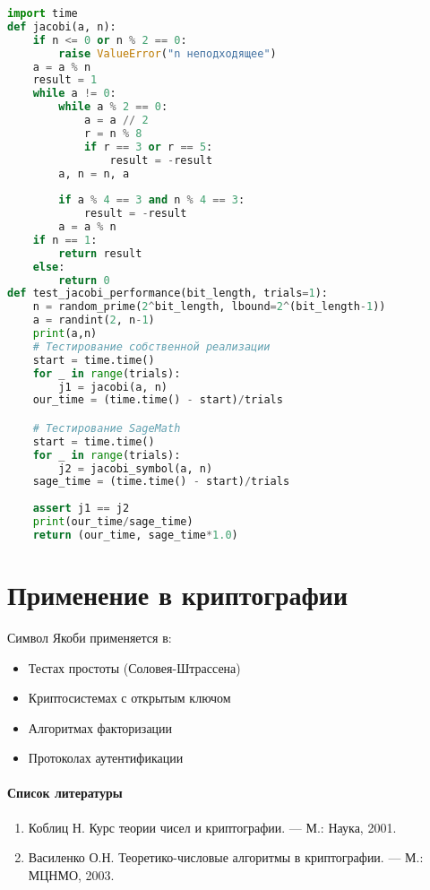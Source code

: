 \documentclass[12pt,a4paper]{article}
\begin{document}
\begin{lstlisting}[language=Python,caption=Код для тестирования]
import time
def jacobi(a, n):
    if n <= 0 or n % 2 == 0:
        raise ValueError("n неподходящее")
    a = a % n
    result = 1
    while a != 0:    
        while a % 2 == 0:
            a = a // 2
            r = n % 8
            if r == 3 or r == 5:
                result = -result    
        a, n = n, a
        
        if a % 4 == 3 and n % 4 == 3:
            result = -result
        a = a % n
    if n == 1:
        return result
    else:
        return 0
def test_jacobi_performance(bit_length, trials=1):
    n = random_prime(2^bit_length, lbound=2^(bit_length-1))
    a = randint(2, n-1)
    print(a,n)
    # Тестирование собственной реализации
    start = time.time()
    for _ in range(trials):
        j1 = jacobi(a, n)
    our_time = (time.time() - start)/trials

    # Тестирование SageMath
    start = time.time()
    for _ in range(trials):
        j2 = jacobi_symbol(a, n)
    sage_time = (time.time() - start)/trials
    
    assert j1 == j2  
    print(our_time/sage_time)
    return (our_time, sage_time*1.0)
\end{lstlisting}

\section{Применение в криптографии}

Символ Якоби применяется в:
\begin{itemize}
\item Тестах простоты (Соловея-Штрассена)
\item Криптосистемах с открытым ключом
\item Алгоритмах факторизации
\item Протоколах аутентификации
\end{itemize}

\newpage
\begin{center}
\paragraph{Список литературы}
\end{center}

\begin{enumerate}
\item Коблиц Н. Курс теории чисел и криптографии. — М.: Наука, 2001.
\item Василенко О.Н. Теоретико-числовые алгоритмы в криптографии. — М.: МЦНМО, 2003.
\end{enumerate}
\end{document}
